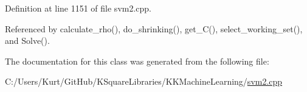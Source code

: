 Definition at line 1151 of file svm2.\+cpp.



Referenced by calculate\+\_\+rho(), do\+\_\+shrinking(), get\+\_\+\+C(), select\+\_\+working\+\_\+set(), and Solve().



The documentation for this class was generated from the following file\+:\begin{DoxyCompactItemize}
\item 
C\+:/\+Users/\+Kurt/\+Git\+Hub/\+K\+Square\+Libraries/\+K\+K\+Machine\+Learning/\hyperlink{svm2_8cpp}{svm2.\+cpp}\end{DoxyCompactItemize}
